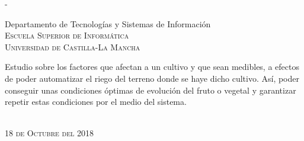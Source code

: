 \begin{titlingpage}
\begin{SingleSpace}
\begin{adjustwidth*}{\unitlength}{-\unitlength}
\begin{center}
\vspace{6mm}
{\large Departamento de Tecnologías y Sistemas de Información\\
\textsc{Escuela Superior de Informática}\\
\textsc{Universidad de Castilla-La Mancha}}\\
\vspace{11mm}
\begin{minipage}{10cm}
Estudio sobre los factores que afectan a un cultivo y que sean medibles, a efectos de poder automatizar el riego del terreno donde se haye dicho cultivo. Así, poder conseguir unas condiciones óptimas de evolución del fruto o vegetal y garantizar repetir estas condiciones por el medio del sistema.
\end{minipage}\\
\vspace{9mm}
{\large\textsc{18 de Octubre del 2018}}
\vspace{12mm}
\end{center}
\begin{flushright}
\end{flushright}
\end{adjustwidth*}
\end{SingleSpace}
\end{titlingpage}